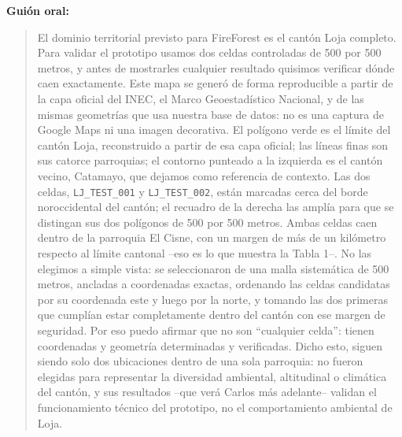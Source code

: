 \documentclass[11pt,a4paper]{article}
\newenvironment{guionoral}{%
  \medskip\noindent\textbf{Gui\'on oral:}\par\smallskip
  \begin{quote}\small
}{%
  \end{quote}
}
\begin{document}
\begin{guionoral}
El dominio territorial previsto para FireForest es el cant\'on Loja
completo. Para validar el prototipo usamos dos celdas controladas de
500 por 500 metros, y antes de mostrarles cualquier resultado
quisimos verificar d\'onde caen exactamente. Este mapa se gener\'o de
forma reproducible a partir de la capa oficial del INEC, el Marco
Geoestad\'istico Nacional, y de las mismas geometr\'ias que usa
nuestra base de datos: no es una captura de Google Maps ni una imagen
decorativa. El pol\'igono verde es el l\'imite del cant\'on Loja,
reconstruido a partir de esa capa oficial; las l\'ineas finas son sus
catorce parroquias; el contorno punteado a la izquierda es el cant\'on
vecino, Catamayo, que dejamos como referencia de contexto. Las dos
celdas, \texttt{LJ\_TEST\_001} y \texttt{LJ\_TEST\_002}, est\'an
marcadas cerca del borde noroccidental del cant\'on; el recuadro de la
derecha las ampl\'ia para que se distingan sus dos pol\'igonos de 500
por 500 metros. Ambas celdas caen dentro de la parroquia El Cisne, con
un margen de m\'as de un kil\'ometro respecto al l\'imite cantonal
--eso es lo que muestra la Tabla 1--. No las elegimos a simple vista:
se seleccionaron de una malla sistem\'atica de 500 metros, ancladas a
coordenadas exactas, ordenando las celdas candidatas por su coordenada
este y luego por la norte, y tomando las dos primeras que cumpl\'ian
estar completamente dentro del cant\'on con ese margen de seguridad.
Por eso puedo afirmar que no son ``cualquier celda'': tienen
coordenadas y geometr\'ia determinadas y verificadas. Dicho esto,
siguen siendo solo dos ubicaciones dentro de una sola parroquia: no
fueron elegidas para representar la diversidad ambiental, altitudinal
o clim\'atica del cant\'on, y sus resultados --que ver\'a Carlos m\'as
adelante-- validan el funcionamiento t\'ecnico del prototipo, no el
comportamiento ambiental de Loja.
\end{guionoral}
\end{document}
